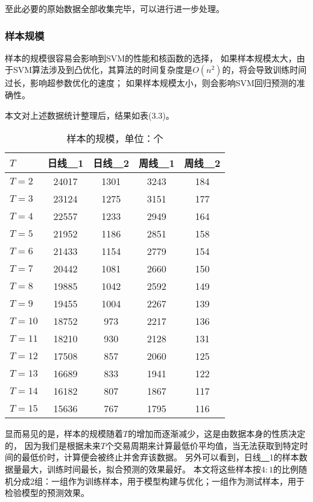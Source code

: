 至此必要的原始数据全部收集完毕，可以进行进一步处理。

\subsubsection{样本规模}

样本的规模很容易会影响到SVM的性能和核函数的选择，
如果样本规模太大，由于SVM算法涉及到凸优化，其算法的时间复杂度是$O(n^2)$的，将会导致训练时间过长，影响超参数优化的速度；
如果样本规模太小，则会影响SVM回归预测的准确性。

本文对上述数据统计整理后，结果如表(3.3)。
\begin{table}[ht]
    \centering
    \caption{样本的规模，单位：个}
    \begin{tabular}{lcccc}
        \hline
        {$T$} & {日线\underline{~~}1} & {日线\underline{~~}2} & {周线\underline{~~}1} & {周线\underline{~~}2}\\
        \hline
        {$T=2$} & {24017} & {1301} & {3243} & {184}\\
        {$T=3$} & {23124} & {1275} & {3151} & {177}\\
        {$T=4$} & {22557} & {1233} & {2949} & {164}\\
        {$T=5$} & {21952} & {1186} & {2851} & {158}\\
        {$T=6$} & {21433} & {1154} & {2779} & {154}\\
        {$T=7$} & {20442} & {1081} & {2660} & {150}\\
        {$T=8$} & {19885} & {1042} & {2592} & {149}\\
        {$T=9$} & {19455} & {1004} & {2267} & {139}\\
        {$T=10$} & {18752} & {973} & {2217} & {136}\\
        {$T=11$} & {18210} & {930} & {2128} & {131}\\
        {$T=12$} & {17508} & {857} & {2060} & {125}\\
        {$T=13$} & {16689} & {833} & {1941} & {122}\\
        {$T=14$} & {16182} & {807} & {1867} & {117}\\
        {$T=15$} & {15636} & {767} & {1795} & {116}\\
        \hline
    \end{tabular}
\end{table}
显而易见的是，样本的规模随着$T$的增加而逐渐减少，这是由数据本身的性质决定的，
因为我们是根据未来$T$个交易周期来计算最低价平均值，当无法获取到特定时间的最低价时，计算便会被终止并舍弃该数据。
另外可以看到，日线\underline{~~}1的样本数据量最大，训练时间最长，拟合预测的效果最好。
本文将这些样本按$4:1$的比例随机分成2组：一组作为训练样本，用于模型构建与优化；一组作为测试样本，用于检验模型的预测效果。

